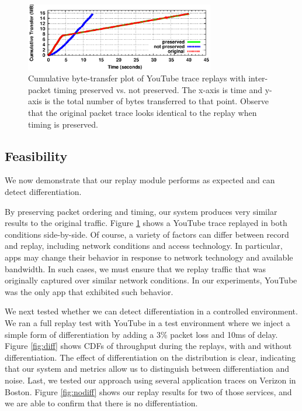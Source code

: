 \documentclass[letterpaper]{sig-alternate-2013}
\begin{document}
\begin{figure}[t]
	\centering
	\includegraphics[width=3.25in]{figures/double.eps}
	\caption{Cumulative byte-transfer plot of YouTube trace replays with inter-packet timing preserved vs. not preserved. The x-axis is time and y-axis is the total number of bytes transferred to that point. Observe that the original packet trace looks identical to the replay when timing is preserved. }
	\label{fig:double}
\end{figure}


\subsection{Feasibility}
We now demonstrate that our replay module performs as expected and can detect differentiation.

By preserving packet ordering and timing, our system produces very similar results to the original traffic. Figure \ref{fig:double} shows a YouTube trace replayed in both conditions side-by-side. Of course, a variety of factors can differ between record and replay, including network conditions and access technology. In particular, apps may change their behavior in response to network technology and available bandwidth. In such cases, we must ensure that we replay traffic that was originally captured over similar network conditions. In our experiments, YouTube was the only app that exhibited such behavior.

We next tested whether we can detect differentiation in a controlled environment. We ran a full replay test with YouTube in a test environment where we inject a simple form of differentiation by adding a 3\% packet loss and 10ms of delay. Figure \ref{fig:diff} shows CDFs of throughput during the replays, with and without differentiation. The effect of differentiation on the distribution is clear, indicating that our system and metrics allow us to distinguish between differentiation and noise. Last, we tested our approach using several application traces on Verizon in Boston. Figure \ref{fig:nodiff} shows our replay results for two of those services, and we are able to confirm that there is no differentiation.
\end{document}
